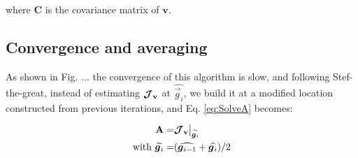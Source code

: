\noindent where \textbf{C} is the covariance matrix of $\mathbf{v}$.


\subsection{Convergence and averaging}

As shown in Fig. ... the convergence of this algorithm is slow, and
following Stef-the-great, instead of estimating $\bm{\mathcal{J}}_{\textbf{v}}$ at
$\widehat{\vec{g}_i}$, we build it at a modified location constructed
from previous iterations, and Eq. \ref{eq:SolveA} becomes:

\begin{alignat}{2}
\A=&\JV\big|_{\widetilde{\vec{g}_i}}\\
\text{with } \widetilde{\vec{g}_i}=&(\widehat{\vec{g}_{i-1}}+\widehat{\vec{g}_{i}})/2
\end{alignat}


